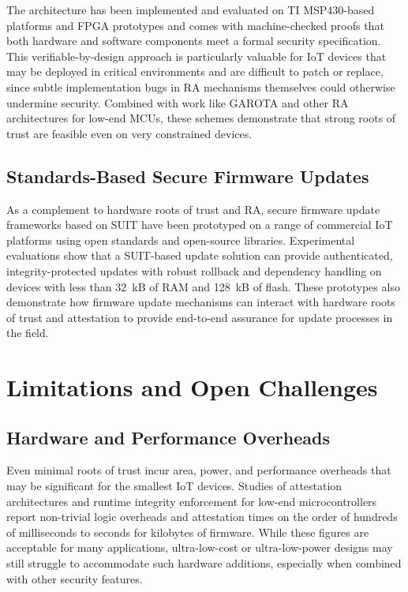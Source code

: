 \documentclass[conference,11pt,a4paper]{IEEEtran}
\begin{document}
The architecture has been implemented and evaluated on TI MSP430-based platforms and FPGA prototypes and comes with machine-checked proofs that both hardware and software components meet a formal security specification. This verifiable-by-design approach is particularly valuable for IoT devices that may be deployed in critical environments and are difficult to patch or replace, since subtle implementation bugs in RA mechanisms themselves could otherwise undermine security.\cite{vRased_usenix,ra_survey} Combined with work like GAROTA and other RA architectures for low-end MCUs, these schemes demonstrate that strong roots of trust are feasible even on very constrained devices.\cite{root_of_trust_lowend}

\subsection{Standards-Based Secure Firmware Updates}
As a complement to hardware roots of trust and RA, secure firmware update frameworks based on SUIT have been prototyped on a range of commercial IoT platforms using open standards and open-source libraries.\cite{suit_survey} Experimental evaluations show that a SUIT-based update solution can provide authenticated, integrity-protected updates with robust rollback and dependency handling on devices with less than 32~kB of RAM and 128~kB of flash.\cite{suit_survey,suit_arch} These prototypes also demonstrate how firmware update mechanisms can interact with hardware roots of trust and attestation to provide end-to-end assurance for update processes in the field.\cite{rats_arch}

\section{Limitations and Open Challenges}
\label{sec:limitations}

\subsection{Hardware and Performance Overheads}
Even minimal roots of trust incur area, power, and performance overheads that may be significant for the smallest IoT devices. Studies of attestation architectures and runtime integrity enforcement for low-end microcontrollers report non-trivial logic overheads and attestation times on the order of hundreds of milliseconds to seconds for kilobytes of firmware.\cite{root_of_trust_lowend,vRased_usenix} While these figures are acceptable for many applications, ultra-low-cost or ultra-low-power designs may still struggle to accommodate such hardware additions, especially when combined with other security features.
\end{document}
